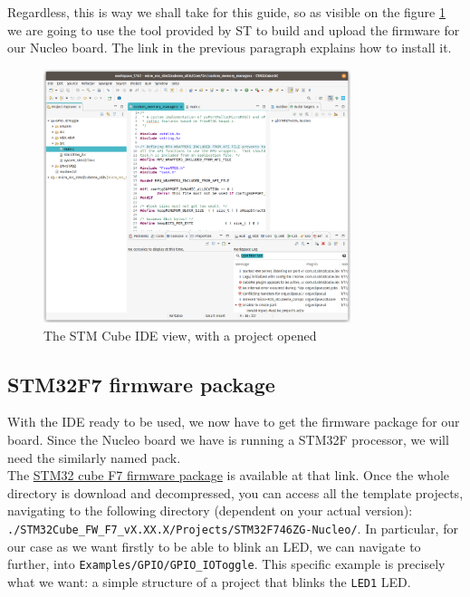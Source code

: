 \documentclass[10pt]{article}
\begin{document}
Regardless, this is way we shall take for this guide, so as visible on the figure \ref{fig:ide} we are going to use the tool provided by ST to build and upload the firmware for our Nucleo board. The link in the previous paragraph explains how to install it.

\begin{figure}[h]
  \centering
  \includegraphics[width=0.8\textwidth]{./img/ide.png}
  \caption{The STM Cube IDE view, with a project opened}
  \label{fig:ide}
\end{figure}

\subsection{STM32F7 firmware package}
\label{sec:stm32f7-firmw-pack}
With the IDE ready to be used, we now have to get the firmware package for our board.
Since the Nucleo board we have is running a STM32F processor, we will need the similarly named pack.\\

The \href{https://www.st.com/content/st_com/en/products/embedded-software/mcu-mpu-embedded-software/stm32-embedded-software/stm32cube-mcu-mpu-packages/stm32cubef7.html}{STM32 cube F7 firmware package} is available at that link. Once the whole directory is download and decompressed, you can access all the template projects, navigating to the following directory (dependent on your actual version): \verb|./STM32Cube_FW_F7_vX.XX.X/Projects/STM32F746ZG-Nucleo/|. In particular, for our case as we want firstly to be able to blink an LED, we can navigate to further, into \verb|Examples/GPIO/GPIO_IOToggle|. This specific example is precisely what we want: a simple structure of a project that blinks the \verb|LED1| LED.
\end{document}

